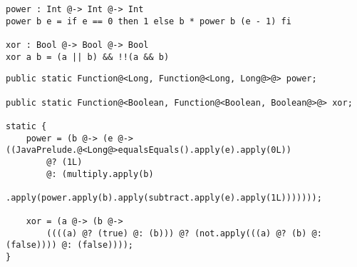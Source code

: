 \vspace{4mm}
\begin{lstlisting}[caption={If e operatori booleani in \textbf{Funx}}, style=funxCode, label={lst:4-ternary-funx}]
power : Int @-> Int @-> Int
power b e = if e == 0 then 1 else b * power b (e - 1) fi

xor : Bool @-> Bool @-> Bool
xor a b = (a || b) && !!(a && b)
\end{lstlisting}
\vspace{4mm}
\begin{lstlisting}[caption={Corrispondenti operatori ternari in \texttt{Java}}, style=javaCode, label={lst:4-ternary-java}]
public static Function@<Long, Function@<Long, Long@>@> power;

public static Function@<Boolean, Function@<Boolean, Boolean@>@> xor;

static {
    power = (b @-> (e @-> ((JavaPrelude.@<Long@>equalsEquals().apply(e).apply(0L))
        @? (1L)
        @: (multiply.apply(b)
            .apply(power.apply(b).apply(subtract.apply(e).apply(1L)))))));

    xor = (a @-> (b @->
        ((((a) @? (true) @: (b))) @? (not.apply(((a) @? (b) @: (false)))) @: (false))));
}
\end{lstlisting}
